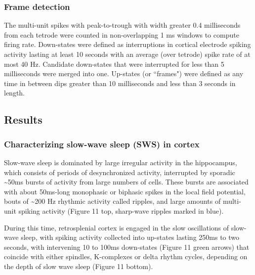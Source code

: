 \documentclass[]{article}
\begin{document}
\subsubsection{Frame detection}

The multi-unit spikes with peak-to-trough with width greater 0.4
milliseconds from each tetrode were counted in non-overlapping 1 ms
windows to compute firing rate. Down-states were defined as
interruptions in cortical electrode spiking activity lasting at least 10
seconds with an average (over tetrode) spike rate of at most 40 Hz.
Candidate down-states that were interrupted for less than 5 milliseconds
were merged into one. Up-states (or ``frames") were defined as any time
in between dips greater than 10 milliseconds and less than 3 seconds in
length.

\subsection{Results}

\subsubsection{Characterizing slow-wave sleep (SWS) in cortex}

Slow-wave sleep is dominated by large irregular activity in the
hippocampus, which consists of periods of desynchronized activity,
interrupted by sporadic \textasciitilde{}50ms bursts of activity from
large numbers of cells. These bursts are associated with about 50ms-long
monophasic or biphasic spikes in the local field potential, bouts of
\textasciitilde{}200 Hz rhythmic activity called ripples, and large
amounts of multi-unit spiking activity (Figure 11 top, sharp-wave
ripples marked in blue).

During this time, retrosplenial cortex is engaged in the slow
oscillations of slow-wave sleep, with spiking activity collected into
up-states lasting 250ms to two seconds, with intervening 10 to 100ms
down-states (Figure 11 green arrows) that coincide with either spindles,
K-complexes or delta rhythm cycles, depending on the depth of slow wave
sleep (Figure 11 bottom).
\end{document}

